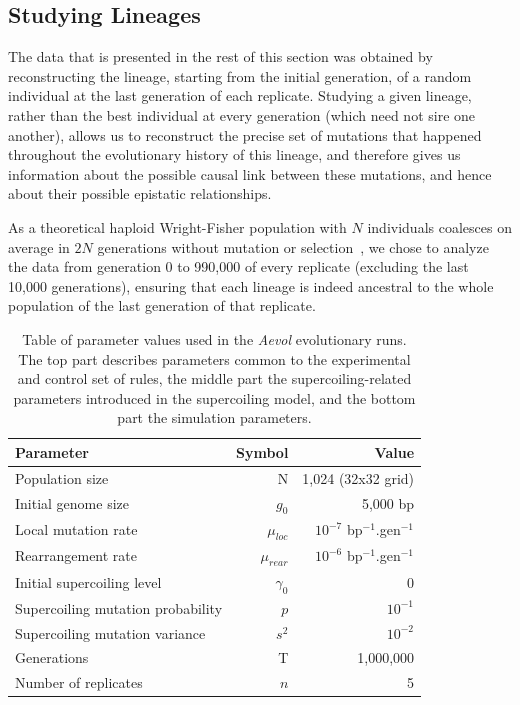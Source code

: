\subsection{Studying Lineages}

The data that is presented in the rest of this section was obtained by reconstructing the lineage, starting from the initial generation, of a random individual at the last generation of each replicate.
Studying a given lineage, rather than the best individual at every generation (which need not sire one another), allows us to reconstruct the precise set of mutations that happened throughout the evolutionary history of this lineage, and therefore gives us information about the possible causal link between these mutations, and hence about their possible epistatic relationships.

As a theoretical haploid Wright-Fisher population with $N$ individuals coalesces on average in $2N$ generations without mutation or selection~\citep{felsenstein2019}, we chose to analyze the data from generation 0 to 990,000 of every replicate (excluding the last 10,000 generations), ensuring that each lineage is indeed ancestral to the whole population of the last generation of that replicate.

\begin{table}
  \begin{center}
    \begin{tabular}{ l r r }
    \toprule
    \textbf{Parameter} & \textbf{Symbol} & \textbf{Value}\\
    \midrule
    Population size & N & 1,024 (32x32 grid) \\
    Initial genome size & $g_0$ & 5,000 bp \\
    Local mutation rate & $\mu_{loc}$ & $10^{-7}$ bp$^{-1}$.gen$^{-1}$ \\
    Rearrangement rate & $\mu_{rear}$ &$10^{-6}$ bp$^{-1}$.gen$^{-1}$ \\
    \midrule
    Initial supercoiling level & $\gamma_0$ & 0 \\
    Supercoiling mutation probability & $p$ & $10^{-1}$ \\
    Supercoiling mutation variance & $s^2$ & $10^{-2}$ \\
    \midrule
    Generations & T & 1,000,000 \\
    Number of replicates & $n$ & 5\\
    \bottomrule
    \end{tabular}
    \end{center}
  \caption[Table of parameter values for the \emph{Aevol} runs]{Table of parameter values used in the \emph{Aevol} evolutionary runs.
  The top part describes parameters common to the experimental and control set of rules, the middle part the supercoiling-related parameters introduced in the supercoiling model, and the bottom part the simulation parameters.}
  \label{tab:aevol:param_values}
\end{table}


